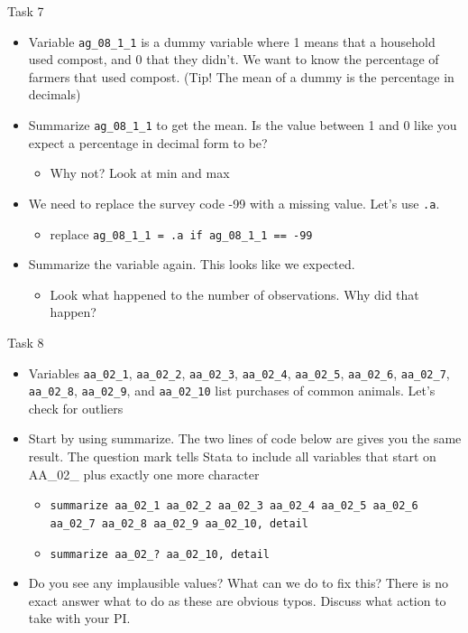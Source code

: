 \documentclass[aspectratio=169]{beamer}
\begin{document}
\begin{frame}{Task 7}
	\begin{itemize}
		\item Variable \texttt{ag\_08\_1\_1} is a dummy variable where 1 means that a household used compost, and 0 that they didn’t. We want to know the percentage of farmers that used compost. (Tip! The mean of a dummy is the percentage in decimals)
		\item Summarize \texttt{ag\_08\_1\_1} to get the mean. Is the value between 1 and 0 like you expect a percentage in decimal form to be?
			\begin{itemize}
				\item Why not? Look at min and max
			\end{itemize}
		\item We need to replace the survey code -99 with a missing value. Let’s use \texttt{.a}.
			\begin{itemize}
				\item replace \texttt{ag\_08\_1\_1 = .a if ag\_08\_1\_1 == -99}
			\end{itemize}
		\item Summarize the variable again. This looks like we expected. 
			\begin{itemize}
				\item Look what happened to the number of observations. Why did that happen?
			\end{itemize}
	\end{itemize}
\end{frame}

\begin{frame}{Task 8}
	\begin{itemize}
		\item Variables \texttt{aa\_02\_1}, \texttt{aa\_02\_2}, \texttt{aa\_02\_3}, \texttt{aa\_02\_4}, \texttt{aa\_02\_5}, \texttt{aa\_02\_6}, \texttt{aa\_02\_7}, \texttt{aa\_02\_8}, \texttt{aa\_02\_9}, and \texttt{aa\_02\_10} list purchases of common animals. Let’s check for outliers
		\item Start by using summarize. The two lines of code below are gives you the same result. The question mark tells Stata to include all variables that start on AA\_02\_ plus exactly one more character 
		\begin{itemize}
			\item \texttt{summarize aa\_02\_1 aa\_02\_2 aa\_02\_3 aa\_02\_4 aa\_02\_5 aa\_02\_6 aa\_02\_7 aa\_02\_8 aa\_02\_9 aa\_02\_10, detail}
			\item \texttt{summarize aa\_02\_? aa\_02\_10, detail}
		\end{itemize}	
		\item Do you see any implausible values? What can we do to fix this? There is no exact answer what to do as these are obvious typos. Discuss what action to take with your PI.
	\end{itemize}
\end{frame}
\end{document}
